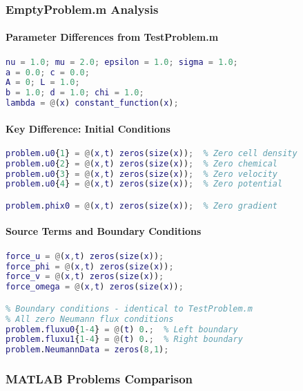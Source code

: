 \subsubsection{EmptyProblem.m Analysis}

\paragraph{Parameter Differences from TestProblem.m}
\begin{lstlisting}[language=Matlab, caption=EmptyProblem.m Parameter Configuration]
% IDENTICAL to TestProblem.m:
nu = 1.0; mu = 2.0; epsilon = 1.0; sigma = 1.0;
a = 0.0; c = 0.0;
A = 0; L = 1.0;
b = 1.0; d = 1.0; chi = 1.0;
lambda = @(x) constant_function(x);
\end{lstlisting}

\paragraph{Key Difference: Initial Conditions}
\begin{lstlisting}[language=Matlab, caption=EmptyProblem.m Initial Conditions]
% ALL initial conditions are zero (unlike TestProblem.m)
problem.u0{1} = @(x,t) zeros(size(x));  % Zero cell density
problem.u0{2} = @(x,t) zeros(size(x));  % Zero chemical
problem.u0{3} = @(x,t) zeros(size(x));  % Zero velocity
problem.u0{4} = @(x,t) zeros(size(x));  % Zero potential

problem.phix0 = @(x,t) zeros(size(x));  % Zero gradient
\end{lstlisting}

\paragraph{Source Terms and Boundary Conditions}
\begin{lstlisting}[language=Matlab, caption=EmptyProblem.m Additional Configuration]
% Source terms - also all zero
force_u = @(x,t) zeros(size(x));
force_phi = @(x,t) zeros(size(x));  
force_v = @(x,t) zeros(size(x));
force_omega = @(x,t) zeros(size(x));

% Boundary conditions - identical to TestProblem.m
% All zero Neumann flux conditions
problem.fluxu0{1-4} = @(t) 0.;  % Left boundary
problem.fluxu1{1-4} = @(t) 0.;  % Right boundary
problem.NeumannData = zeros(8,1);
\end{lstlisting}

\subsubsection{MATLAB Problems Comparison}


